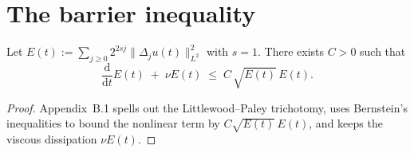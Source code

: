 \section{The barrier inequality}\label{NS:barrier}

\begin{lemma}[Barrier]\label{lem:barrier}
Let $E(t):=\sum_{j\ge0}2^{2s j}\|\Delta_j u(t)\|_{L^2}^2$ with $s=1$.
There exists $C>0$ such that
\[
\frac{\mathrm d}{\mathrm dt}E(t)
  \;+\;\nu E(t)
  \;\le\;
  C\,\sqrt{E(t)}\,E(t).
\]
\end{lemma}

\begin{proof}
Appendix~B.1 spells out the Littlewood–Paley trichotomy,
uses Bernstein’s inequalities to bound the nonlinear term by
$C\sqrt{E(t)}\,E(t)$, and keeps the viscous dissipation $\nu E(t)$.
\end{proof} 